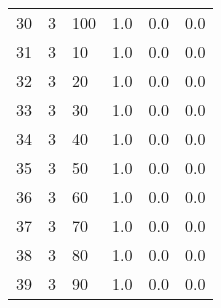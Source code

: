 \documentclass{article}
\begin{document}
\begin{center}
\begin{tabular}{llllll}
30 &         3 &        100 &              1.0 &                       0.0 &                                   0.0 \\
31 &         3 &         10 &              1.0 &                       0.0 &                                   0.0 \\
32 &         3 &         20 &              1.0 &                       0.0 &                                   0.0 \\
33 &         3 &         30 &              1.0 &                       0.0 &                                   0.0 \\
34 &         3 &         40 &              1.0 &                       0.0 &                                   0.0 \\
35 &         3 &         50 &              1.0 &                       0.0 &                                   0.0 \\
36 &         3 &         60 &              1.0 &                       0.0 &                                   0.0 \\
37 &         3 &         70 &              1.0 &                       0.0 &                                   0.0 \\
38 &         3 &         80 &              1.0 &                       0.0 &                                   0.0 \\
39 &         3 &         90 &              1.0 &                       0.0 &                                   0.0 \\
\bottomrule
\end{tabular}
\end{center}
\newpage
\end{document}
